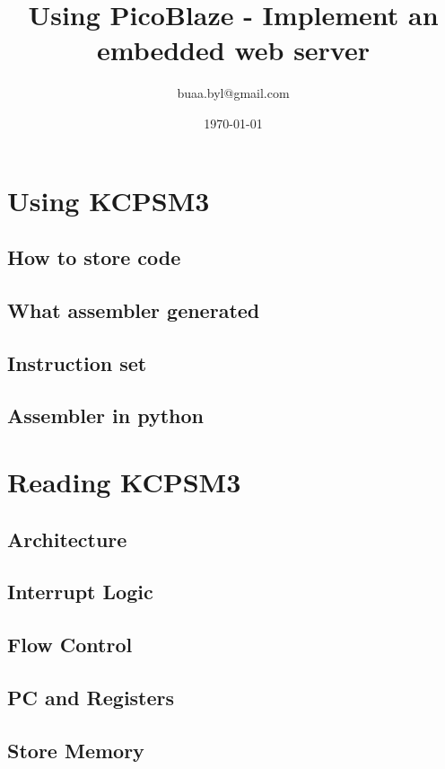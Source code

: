 \documentclass[a4paper]{book}
\begin{document}
 \begin{CJK*}{UTF8}{song} \large

\title{Using PicoBlaze - Implement an embedded web server}
\author{buaa.byl@gmail.com}
\date{\today}
\maketitle
\tableofcontents



\part{Using KCPSM3}
\chapter{How to store code}
\chapter{What assembler generated}
\chapter{Instruction set}
\chapter{Assembler in python}

\part{Reading KCPSM3}
\chapter{Architecture}

\chapter{Interrupt Logic}
\chapter{Flow Control}
\chapter{PC and Registers}
\chapter{Store Memory}

\end{CJK*}
\end{document}

